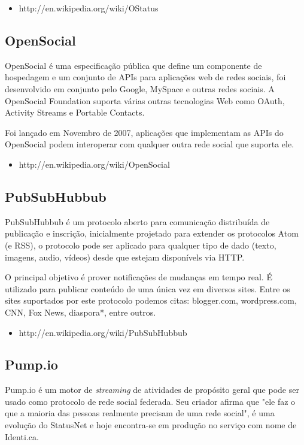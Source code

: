 \documentclass[12pt]{article}
\begin{document}
\begin{itemize}
  \item http://en.wikipedia.org/wiki/OStatus
\end{itemize}

\subsection{OpenSocial}

OpenSocial é uma especificação pública que define um componente de hospedagem
e um conjunto de APIs para aplicações web de redes sociais, foi desenvolvido
em conjunto pelo Google, MySpace e outras redes sociais. A OpenSocial
Foundation suporta várias outras tecnologias Web como OAuth, Activity Streams
e Portable Contacts.

Foi lançado em Novembro de 2007, aplicações que implementam as APIs do
OpenSocial podem interoperar com qualquer outra rede social que suporta ele.

\begin{itemize}
  \item http://en.wikipedia.org/wiki/OpenSocial
\end{itemize}

\subsection{PubSubHubbub}

PubSubHubbub é um protocolo aberto para comunicação distribuída de publicação
e inscrição, inicialmente projetado para extender os protocolos Atom (e RSS),
o protocolo pode ser aplicado para qualquer tipo de dado (texto, imagens,
audio, vídeos) desde que estejam disponívels via HTTP.

O principal objetivo é prover notificações de mudanças em tempo real. É
utilizado para publicar conteúdo de uma única vez em diversos sites. Entre os
sites suportados por este protocolo podemos citas: blogger.com, wordpress.com,
CNN, Fox News, diaspora*, entre outros.

\begin{itemize}
  \item http://en.wikipedia.org/wiki/PubSubHubbub
\end{itemize}

\subsection{Pump.io}

Pump.io é um motor de {\it streaming} de atividades de propósito geral que
pode ser usado como protocolo de rede social federada. Seu criador afirma que
"ele faz o que a maioria das pessoas realmente precisam de uma rede social", é
uma evolução do StatusNet e hoje encontra-se em produção no serviço com nome
de Identi.ca.
\end{document}
